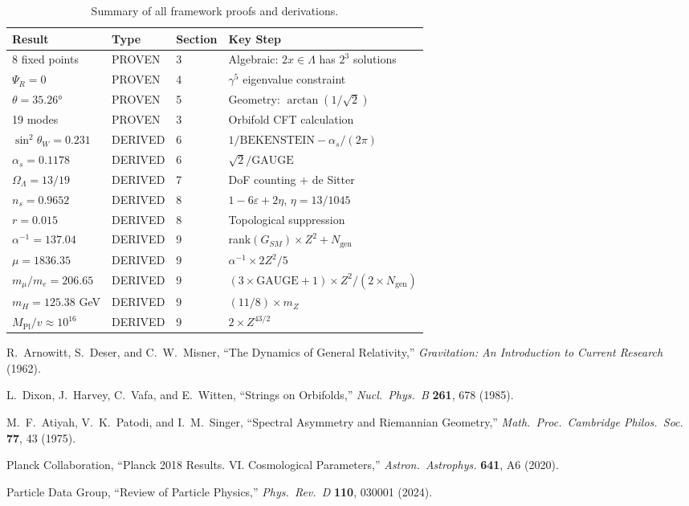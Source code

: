 \documentclass[12pt,a4paper]{article}
\newcommand{\OmegaL}{\Omega_\Lambda}
\newcommand{\sinW}{\sin^2\theta_W}
\newcommand{\Zsq}{Z^2}
\newcommand{\GAUGE}{\text{GAUGE}}
\newcommand{\BEKENSTEIN}{\text{BEKENSTEIN}}
\newcommand{\Ngen}{N_{\text{gen}}}
\begin{document}
\begin{table}[H]
\centering
\begin{tabular}{llll}
\toprule
\textbf{Result} & \textbf{Type} & \textbf{Section} & \textbf{Key Step} \\
\midrule
8 fixed points & PROVEN & 3 & Algebraic: $2x \in \Lambda$ has $2^3$ solutions \\
$\Psi_R = 0$ & PROVEN & 4 & $\gamma^5$ eigenvalue constraint \\
$\theta = 35.26°$ & PROVEN & 5 & Geometry: $\arctan(1/\sqrt{2})$ \\
19 modes & PROVEN & 3 & Orbifold CFT calculation \\
$\sinW = 0.231$ & DERIVED & 6 & $1/\BEKENSTEIN - \alpha_s/(2\pi)$ \\
$\alpha_s = 0.1178$ & DERIVED & 6 & $\sqrt{2}/\GAUGE$ \\
$\OmegaL = 13/19$ & DERIVED & 7 & DoF counting + de Sitter \\
$n_s = 0.9652$ & DERIVED & 8 & $1 - 6\varepsilon + 2\eta$, $\eta = 13/1045$ \\
$r = 0.015$ & DERIVED & 8 & Topological suppression \\
$\alpha^{-1} = 137.04$ & DERIVED & 9 & rank$(G_{SM}) \times \Zsq + \Ngen$ \\
$\mu = 1836.35$ & DERIVED & 9 & $\alpha^{-1} \times 2\Zsq/5$ \\
$m_\mu/m_e = 206.65$ & DERIVED & 9 & $(3 \times \GAUGE + 1) \times \Zsq / (2 \times \Ngen)$ \\
$m_H = 125.38$ GeV & DERIVED & 9 & $(11/8) \times m_Z$ \\
$M_{\text{Pl}}/v \approx 10^{16}$ & DERIVED & 9 & $2 \times Z^{43/2}$ \\
\bottomrule
\end{tabular}
\caption{Summary of all framework proofs and derivations.}
\end{table}

\begin{thebibliography}{99}

 R.~Arnowitt, S.~Deser, and C.~W.~Misner,
``The Dynamics of General Relativity,''
\textit{Gravitation: An Introduction to Current Research} (1962).

 L.~Dixon, J.~Harvey, C.~Vafa, and E.~Witten,
``Strings on Orbifolds,''
\textit{Nucl.\ Phys.\ B} \textbf{261}, 678 (1985).

 M.~F.~Atiyah, V.~K.~Patodi, and I.~M.~Singer,
``Spectral Asymmetry and Riemannian Geometry,''
\textit{Math.\ Proc.\ Cambridge Philos.\ Soc.} \textbf{77}, 43 (1975).

 Planck Collaboration,
``Planck 2018 Results. VI. Cosmological Parameters,''
\textit{Astron.\ Astrophys.} \textbf{641}, A6 (2020).

 Particle Data Group,
``Review of Particle Physics,''
\textit{Phys.\ Rev.\ D} \textbf{110}, 030001 (2024).

\end{thebibliography}
\end{document}
